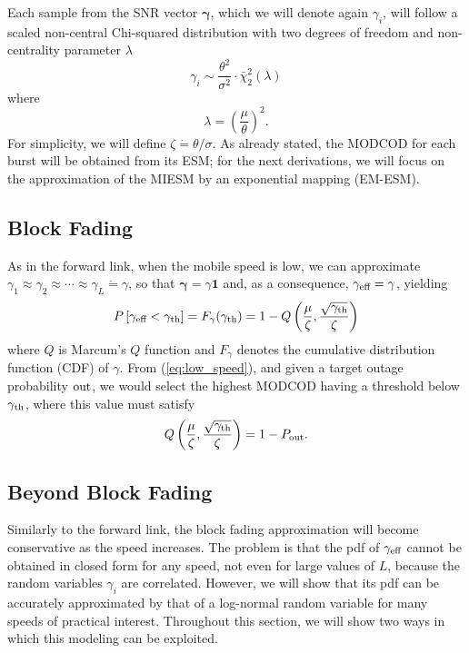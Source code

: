 \documentclass[journal,onecolumn,10pt,a4paper]{IEEEtran}
\def\1{{\mathbf 1}}
\def\gammab{{\boldsymbol \gamma}}
\begin{document}
Each sample from the SNR vector $\gammab$, which we will denote again $\gamma_i$, will follow a scaled non-central Chi-squared distribution with two degrees of freedom and non-centrality parameter $\lambda$
\begin{equation}\label{eq:distr_gamma}
 \gamma_i\sim\frac{\theta^2}{\sigma^2}\cdot\bar\chi_2^2(\lambda)
\end{equation}
where
\begin{equation}
 \lambda = \left(\frac{\mu}{\theta}\right)^2.
\end{equation}
For simplicity, we will define $\zeta\dot=\theta/\sigma$. As already stated, the MODCOD for each burst will be obtained from its ESM; for the next derivations, we will focus on the approximation of the MIESM by an exponential mapping (EM-ESM).


\subsection{Block Fading}
\label{sec:block_fading_rl}
As in the forward link, when the mobile speed is low, we can approximate $\gamma_1 \approx \gamma_2 \approx \cdots \approx\gamma_L \dot= \gamma$, so that $\gammab = \gamma\1$ and, as a consequence, $\gamma_{\textnormal{eff}} = \gamma$, yielding
\begin{equation}\label{eq:low_speed}
 P\left[\gamma_{\textnormal{eff}}<\gamma_{\textnormal{th}}\right] = F_\gamma(\gamma_{\textnormal{th}}) = 1-Q\left(\frac{\mu}{\zeta},\frac{\sqrt{\gamma_{\textnormal{th}}}}{\zeta}\right)
\end{equation}
where $Q$ is Marcum's $Q$ function and $F_\gamma$ denotes the cumulative distribution function (CDF) of $\gamma$. From (\ref{eq:low_speed}), and given a target outage probability ${\textnormal{out}}$, we would select the highest MODCOD having a threshold below $\gamma_{\textnormal{th}}$, where this value must satisfy
\begin{equation}
 Q\left(\frac{\mu}{\zeta},\frac{\sqrt{\gamma_{\textnormal{th}}}}{\zeta}\right) = 1-P_{\textnormal{out}}.
\end{equation}



\subsection{Beyond Block Fading}
\label{sec:high_speed}
Similarly to the forward link, the block fading approximation will become conservative as the speed increases. The problem is that the pdf of $\gamma_{\textnormal{eff}}$ cannot be obtained in closed form for any speed, not even for large values of $L$, because the random variables $\gamma_i$ are correlated. However, we will show that its pdf can be accurately approximated by that of a log-normal random variable for many speeds of practical interest. Throughout this section, we will show two ways in which this modeling can be exploited.
\end{document}
